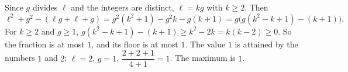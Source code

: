 Since $g$ divides $\ell$ and the integers are distinct, $\ell=kg$ with $k\ge2$. Then
\[
\ell^2+g^2-(\ell g+\ell+g)=g^2(k^2+1)-g^2k-g(k+1)=g\bigl(g(k^2-k+1)-(k+1)\bigr).
\]
For $k\ge2$ and $g\ge1$, $g(k^2-k+1)-(k+1)\ge k^2-2k=k(k-2)\ge0$. So the fraction is at most $1$, and its floor is at most $1$. The value $1$ is attained by the numbers $1$ and $2$: $\ell=2$, $g=1$, $\dfrac{2+2+1}{4+1}=1$. The maximum is $\boxed{1}$.
